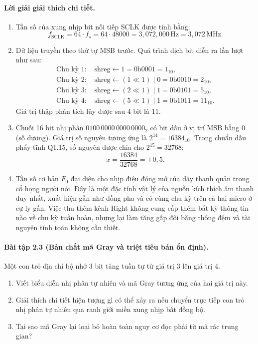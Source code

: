 \paragraph{Lời giải giải thích chi tiết.}
\begin{enumerate}[label=\alph*)]
    \item Tần số của xung nhịp bit nối tiếp SCLK được tính bằng:
    \[
    f_{\mathrm{SCLK}} = 64\cdot f_s = 64\cdot 48000 = 3{,}072{,}000\,\text{Hz} = 3{,}072\,\text{MHz}.
    \]
    \item Dữ liệu truyền theo thứ tự MSB trước. Quá trình dịch bit diễn ra lần lượt như sau:
    \begin{align*}
    \text{Chu kỳ 1: } & \text{shreg} \leftarrow 1 = 0\mathrm{b}0001 = 1_{10},\\
    \text{Chu kỳ 2: } & \text{shreg} \leftarrow (1 \ll 1) \mid 0 = 0\mathrm{b}0010 = 2_{10},\\
    \text{Chu kỳ 3: } & \text{shreg} \leftarrow (2 \ll 1) \mid 1 = 0\mathrm{b}0101 = 5_{10},\\
    \text{Chu kỳ 4: } & \text{shreg} \leftarrow (5 \ll 1) \mid 1 = 0\mathrm{b}1011 = 11_{10}.
    \end{align*}
    Giá trị thập phân tích lũy được sau 4 bit là $11$.
    \item Chuỗi 16 bit nhị phân $0100\,0000\,0000\,0000_2$ có bit dấu ở vị trí MSB bằng $0$ (số dương). Giá trị số nguyên tương ứng là $2^{14} = 16384_{10}$. Trong chuẩn dấu phẩy tĩnh Q1.15, số nguyên được chia cho $2^{15} = 32768$:
    \[
    x = \frac{16384}{32768} = +0{,}5.
    \]
    \item Tần số cơ bản $F_0$ đại diện cho nhịp điệu đóng mở của dây thanh quản trong cổ họng người nói. Đây là một đặc tính vật lý của nguồn kích thích âm thanh duy nhất, xuất hiện gần như đồng pha và có cùng chu kỳ trên cả hai micro ở cự ly gần. Việc thu thêm kênh Right không cung cấp thêm bất kỳ thông tin nào về chu kỳ tuần hoàn, nhưng lại làm tăng gấp đôi băng thông đệm và tài nguyên tính toán không cần thiết.
\end{enumerate}

\paragraph{Bài tập 2.3 (Bản chất mã Gray và triệt tiêu bán ổn định).}
Một con trỏ địa chỉ bộ nhớ 3 bit tăng tuần tự từ giá trị $3$ lên giá trị $4$.
\begin{enumerate}[label=\alph*)]
    \item Viết biểu diễn nhị phân tự nhiên và mã Gray tương ứng của hai giá trị này.
    \item Giải thích chi tiết hiện tượng gì có thể xảy ra nếu chuyển trực tiếp con trỏ nhị phân tự nhiên qua ranh giới miền xung nhịp bất đồng bộ.
    \item Tại sao mã Gray lại loại bỏ hoàn toàn nguy cơ đọc phải từ mã rác trung gian?
\end{enumerate}

